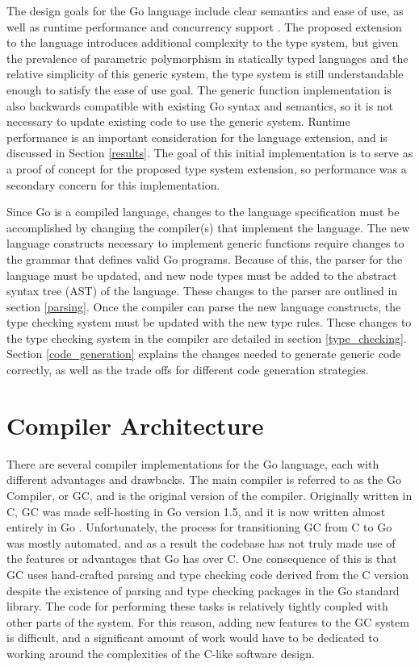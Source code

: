 \documentclass[letterpaper,11pt]{article}
\begin{document}
The design goals for the Go language include clear semantics and ease of use, as well as runtime performance and concurrency support \cite{godesign}. The proposed extension to the language introduces additional complexity to the type system, but given the prevalence of parametric polymorphism in statically typed languages and the relative simplicity of this generic system, the type system is still understandable enough to satisfy the ease of use goal. The generic function implementation is also backwards compatible with existing Go syntax and semantics, so it is not necessary to update existing code to use the generic system. Runtime performance is an important consideration for the language extension, and is discussed in Section \ref{results}. The goal of this initial implementation is to serve as a proof of concept for the proposed type system extension, so performance was a secondary concern for this implementation.

Since Go is a compiled language, changes to the language specification must be accomplished by changing the compiler(s) that implement the language. The new language constructs necessary to implement generic functions require changes to the grammar that defines valid Go programs. Because of this, the parser for the language must be updated, and new node types must be added to the abstract syntax tree (AST) of the language. These changes to the parser are outlined in section \ref{parsing}. Once the compiler can parse the new language constructs, the type checking system must be updated with the new type rules. These changes to the type checking system in the compiler are detailed in section \ref{type_checking}. Section \ref{code_generation} explains the changes needed to generate generic code correctly, as well as the trade offs for different code generation strategies. 

\section{Compiler Architecture} \label{architecture}

There are several compiler implementations for the Go language, each with different advantages and drawbacks. The main compiler is referred to as the Go Compiler, or GC, and is the original version of the compiler. Originally written in C, GC was made self-hosting in Go version 1.5, and it is now written almost entirely in Go \cite{goselfhost}. Unfortunately, the process for transitioning GC from C to Go was mostly automated, and as a result the codebase has not truly made use of the features or advantages that Go has over C. One consequence of this is that GC uses hand-crafted parsing and type checking code derived from the C version despite the existence of parsing and type checking packages in the Go standard library. The code for performing these tasks is relatively tightly coupled with other parts of the system. For this reason, adding new features to the GC system is difficult, and a significant amount of work would have to be dedicated to working around the complexities of the C-like software design.
\end{document}
